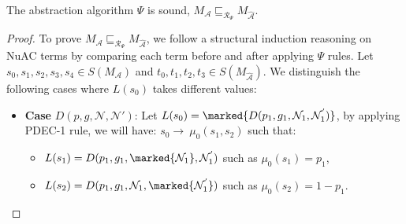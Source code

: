 \begin{lemma}%
The abstraction algorithm $\Psi$ is sound, \ie $M_\mathcal{{A}}\sqsubseteq_{\mathscr{R}_\Psi}M_\mathcal{{\widehat{A}}}$.
\end{lemma}
\begin{proof}
To prove $M_\mathcal{{A}}\sqsubseteq_{\mathscr{R}_\Psi}M_\mathcal{{\widehat{A}}}$, we follow a structural induction reasoning on NuAC terms by comparing each term before and after applying  $\Psi$ rules. Let $s_0,s_1,s_2,s_3,s_4\in S(M_\mathcal{{A}})$ and $t_0,t_1,t_2,t_3\in S(M_\mathcal{{\widehat{A}}})$. We distinguish the following cases where $L(s_0)$ takes different values:
\begin{itemize}
  \item \textbf{Case} $D(p,g,\mathcal{N},\mathcal{N'})$:
Let $L(s_0)=\marked{D(p_{1},g_{1},\mathcal{N}_{1},\mathcal{N}^{'}_{1})}$, by applying PDEC-1 rule, we will have: $s_{0}\rightarrow~\mu_{0}(s_1,s_2)$ such that:

 \begin{itemize}
   \item  $L(s_1)=D(p_{1},g_{1},\marked{\mathcal{N}_{1}},\mathcal{N}^{'}_{1})$ such as $\mu_{0}(s_1)=p_1$,
   \item $L(s_2)=D(p_{1},g_{1},\mathcal{N}_{1},\marked{\mathcal{N}^{'}_{1}})$  such as $\mu_{0}(s_2)=1-p_1$.
 \end{itemize}


\end{itemize}
\end{proof}
